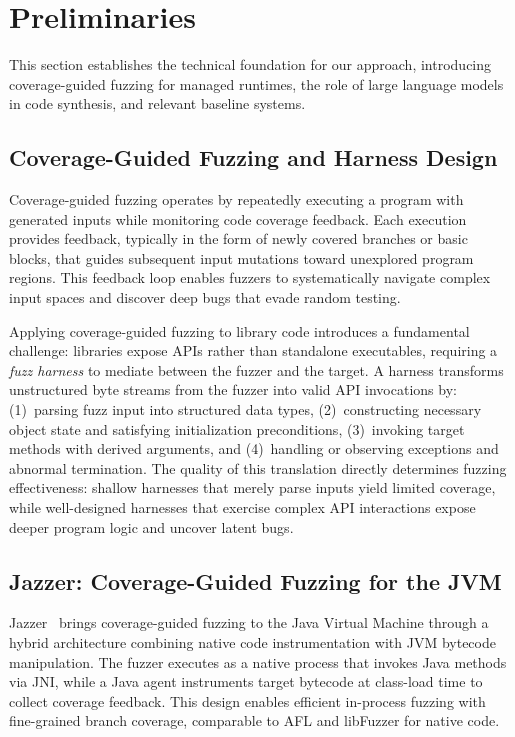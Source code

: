 
\section{Preliminaries}

This section establishes the technical foundation for our approach, introducing coverage-guided fuzzing for managed runtimes, the role of large language models in code synthesis, and relevant baseline systems.

\subsection{Coverage-Guided Fuzzing and Harness Design}
\label{sec:prelim:fuzzing}

Coverage-guided fuzzing operates by repeatedly executing a program with generated inputs while monitoring code coverage feedback. Each execution provides feedback, typically in the form of newly covered branches or basic blocks, that guides subsequent input mutations toward unexplored program regions. This feedback loop enables fuzzers to systematically navigate complex input spaces and discover deep bugs that evade random testing.

Applying coverage-guided fuzzing to library code introduces a fundamental challenge: libraries expose APIs rather than standalone executables, requiring a \emph{fuzz harness} to mediate between the fuzzer and the target. A harness transforms unstructured byte streams from the fuzzer into valid API invocations by: (1)~parsing fuzz input into structured data types, (2)~constructing necessary object state and satisfying initialization preconditions, (3)~invoking target methods with derived arguments, and (4)~handling or observing exceptions and abnormal termination. The quality of this translation directly determines fuzzing effectiveness: shallow harnesses that merely parse inputs yield limited coverage, while well-designed harnesses that exercise complex API interactions expose deeper program logic and uncover latent bugs.

\subsection{Jazzer: Coverage-Guided Fuzzing for the JVM}
\label{sec:prelim:jazzer}

Jazzer~\cite{CITE:Jazzer} brings coverage-guided fuzzing to the Java Virtual Machine through a hybrid architecture combining native code instrumentation with JVM bytecode manipulation. The fuzzer executes as a native process that invokes Java methods via JNI, while a Java agent instruments target bytecode at class-load time to collect coverage feedback. This design enables efficient in-process fuzzing with fine-grained branch coverage, comparable to AFL and libFuzzer for native code.

